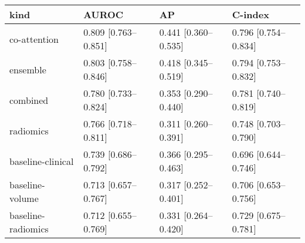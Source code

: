 \begin{tabular}{llll}
\toprule
              kind &                AUROC &                   AP &              C-index \\
\midrule
      co-attention & 0.809 [0.763--0.851] & 0.441 [0.360--0.535] & 0.796 [0.754--0.834] \\
          ensemble & 0.803 [0.758--0.846] & 0.418 [0.345--0.519] & 0.794 [0.753--0.832] \\
          combined & 0.780 [0.733--0.824] & 0.353 [0.290--0.440] & 0.781 [0.740--0.819] \\
         radiomics & 0.766 [0.718--0.811] & 0.311 [0.260--0.391] & 0.748 [0.703--0.790] \\
 baseline-clinical & 0.739 [0.686--0.792] & 0.366 [0.295--0.463] & 0.696 [0.644--0.746] \\
   baseline-volume & 0.713 [0.657--0.767] & 0.317 [0.252--0.401] & 0.706 [0.653--0.756] \\
baseline-radiomics & 0.712 [0.655--0.769] & 0.331 [0.264--0.420] & 0.729 [0.675--0.781] \\
\bottomrule
\end{tabular}
